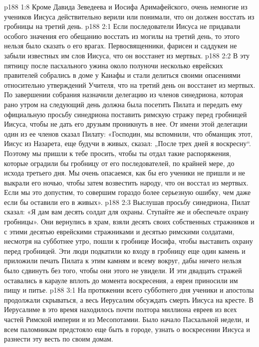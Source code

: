 \vs p188 1:8 Кроме Давида Зеведеева и Иосифа Аримафейского, очень немногие из учеников Иисуса действительно верили или понимали, что он должен восстать из гробницы на третий день.
\vs p188 2:1 Если последователи Иисуса не придавали особого значения его обещанию восстать из могилы на третий день, то этого нельзя было сказать о его врагах. Первосвященники, фарисеи и саддукеи не забыли известных им слов Иисуса, что он восстанет из мертвых.
\vs p188 2:2 В эту пятницу после пасхального ужина около полуночи несколько еврейских правителей собрались в доме у Каиафы и стали делиться своими опасениями относительно утверждений Учителя, что на третий день он восстанет из мертвых. По завершении собрания назначили делегацию из членов синедриона, которая рано утром на следующий день должна была посетить Пилата и передать ему официальную просьбу синедриона поставить римскую стражу перед гробницей Иисуса, чтобы не дать его друзьям проникнуть в нее. От имени этой делегации один из ее членов сказал Пилату: «Господин, мы вспомнили, что обманщик этот, Иисус из Назарета, еще будучи в живых, сказал: „После трех дней я воскресну“. Поэтому мы пришли к тебе просить, чтобы ты отдал такие распоряжения, которые оградили бы гробницу от его последователей, по крайней мере, до исхода третьего дня. Мы очень опасаемся, как бы его ученики не пришли и не выкрали его ночью, чтобы затем возвестить народу, что он восстал из мертвых. Если мы это допустим, то совершим гораздо более серьезную ошибку, чем даже если бы оставили его в живых».
\vs p188 2:3 Выслушав просьбу синедриона, Пилат сказал: «Я дам вам десять солдат для охраны. Ступайте же и обеспечьте охрану гробницы». Они вернулись в храм, взяли десять своих собственных стражников и с этими десятью еврейскими стражниками и десятью римскими солдатами, несмотря на субботнее утро, пошли к гробнице Иосифа, чтобы выставить охрану перед гробницей. Эти люди подкатили ко входу в гробницу еще один камень и приложили печать Пилата к этим камням и всему вокруг, дабы ничего нельзя было сдвинуть без того, чтобы они этого не увидели. И эти двадцать стражей оставались в карауле вплоть до момента воскресения, а евреи приносили им пищу и питье.
\vs p188 3:1 На протяжении всего субботнего дня ученики и апостолы продолжали скрываться, а весь Иерусалим обсуждать смерть Иисуса на кресте. В Иерусалиме в это время находилось почти полтора миллиона евреев из всех частей Римской империи и из Месопотамии. Было начало Пасхальной недели, и всем паломникам предстояло еще быть в городе, узнать о воскресении Иисуса и разнести эту весть по своим домам.
